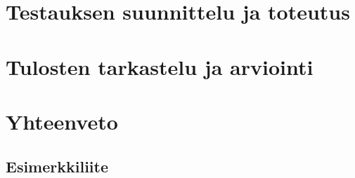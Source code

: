 \documentclass[finnish, authoryear]{config/tauthesis}
\theoremstyle{definition}
\begin{document}
\chapter{Testauksen suunnittelu ja toteutus}
\label{ch:testauksen_suunnittelu_ja_toteutus}

\chapter{Tulosten tarkastelu ja arviointi}
\label{ch:tulosten_tarkastelu_ja_arviointi}

\chapter{Yhteenveto}
\label{ch:yhteenveto}

\printbibliography[heading=bibintoc]

\begin{appendices}
\chapter{Esimerkkiliite}
\label{ch:liite}

\end{appendices}
\end{document}
